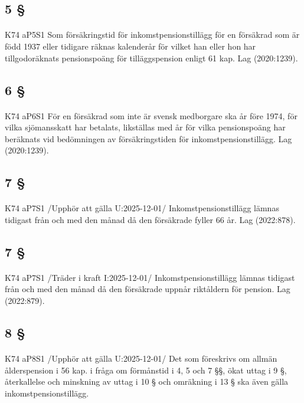 \documentclass[a4paper,notitlepage,openany,10pt]{book}
\begin{document}
\subsection*{5 §}
\paragraph*{}
{\tiny K74 aP5S1}
Som försäkringstid för inkomstpensionstillägg för en försäkrad som är född 1937 eller tidigare räknas kalenderår för vilket han eller hon har tillgodoräknats pensionspoäng för tilläggspension enligt 61 kap.
Lag (2020:1239).
\subsection*{6 §}
\paragraph*{}
{\tiny K74 aP6S1}
För en försäkrad som inte är svensk medborgare ska år före 1974, för vilka sjömansskatt har betalats, likställas med år för vilka pensionspoäng har beräknats vid bedömningen av försäkringstiden för inkomstpensionstillägg.
Lag (2020:1239).
\subsection*{7 §}
\paragraph*{}
{\tiny K74 aP7S1}
/Upphör att gälla U:2025-12-01/
Inkomstpensionstillägg lämnas tidigast från och med den månad då den försäkrade fyller 66 år.
Lag (2022:878).
\subsection*{7 §}
\paragraph*{}
{\tiny K74 aP7S1}
/Träder i kraft I:2025-12-01/
Inkomstpensionstillägg lämnas tidigast från och med den månad då den försäkrade uppnår riktåldern för pension.
Lag (2022:879).
\subsection*{8 §}
\paragraph*{}
{\tiny K74 aP8S1}
/Upphör att gälla U:2025-12-01/
Det som föreskrivs om allmän ålderspension i 56 kap. i fråga om förmånstid i 4, 5 och 7 §§, ökat uttag i 9 §, återkallelse och minskning av uttag i 10 § och omräkning i 13 § ska även gälla inkomstpensionstillägg.
\end{document}
